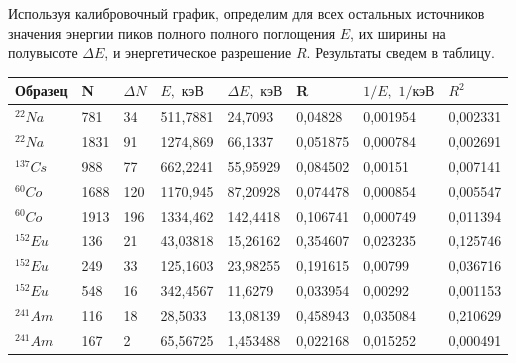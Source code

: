 \documentclass[a4paper,12pt]{article} %
\begin{document}
\noindent Используя калибровочный график, определим для всех остальных источников значения энергии пиков полного полного поглощения $E$, их ширины на полувысоте $\Delta E$, и энергетическое разрешение $R$. Результаты сведем в таблицу.

\medskip

\begin{table}[h!]
\begin{tabular}{|l|l|l|l|l|l|l|l|}
\hline
Образец    & N    & $\Delta N$ & $E, \text{ кэВ}$ & $\Delta E, \text{ кэВ}$ & R        & $1/E, \text{ 1/кэВ}$ & $R^2$    \\ \hline
$^{22}Na$  & 781  & 34         & 511,7881         & 24,7093                 & 0,04828  & 0,001954             & 0,002331 \\ \hline
$^{22}Na$  & 1831 & 91         & 1274,869         & 66,1337                 & 0,051875 & 0,000784             & 0,002691 \\ \hline
$^{137}Cs$ & 988  & 77         & 662,2241         & 55,95929                & 0,084502 & 0,00151              & 0,007141 \\ \hline
$^{60}Co$  & 1688 & 120        & 1170,945         & 87,20928                & 0,074478 & 0,000854             & 0,005547 \\ \hline
$^{60}Co$  & 1913 & 196        & 1334,462         & 142,4418                & 0,106741 & 0,000749             & 0,011394 \\ \hline
$^{152}Eu$ & 136  & 21         & 43,03818         & 15,26162                & 0,354607 & 0,023235             & 0,125746 \\ \hline
$^{152}Eu$ & 249  & 33         & 125,1603         & 23,98255                & 0,191615 & 0,00799              & 0,036716 \\ \hline
$^{152}Eu$ & 548  & 16         & 342,4567         & 11,6279                 & 0,033954 & 0,00292              & 0,001153 \\ \hline
$^{241}Am$ & 116  & 18         & 28,5033          & 13,08139                & 0,458943 & 0,035084             & 0,210629 \\ \hline
$^{241}Am$ & 167  & 2          & 65,56725         & 1,453488                & 0,022168 & 0,015252             & 0,000491 \\ \hline
\end{tabular}
\end{table}

\medskip
\end{document}
